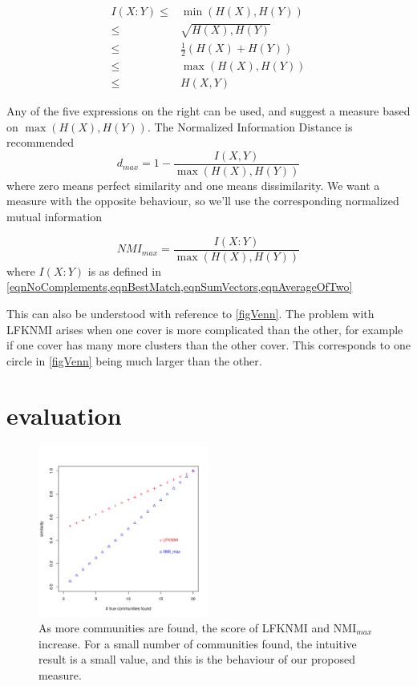 \documentclass[9pt,technote]{IEEEtran}
\begin{document}
\begin{equation}
	\begin{split}
	I(X:Y) \leq & \min(H(X),H(Y)) \\
	       \leq & \sqrt{H(X),H(Y)} \\
	       \leq & \frac12 \left(H(X)+H(Y)\right) \\
	       \leq & \max(H(X),H(Y)) \\
	       \leq & H(X,Y)
	\end{split}
\end{equation}

Any of the five expressions on the right can be used, and \cite{VinhEppsBailey} suggest
a measure based on $\max(H(X),H(Y))$. The Normalized Information Distance is recommended
\begin{equation*}
	d_{max} = 1 - \frac{ I(X,Y) }{ \max(H(X),H(Y)) }
\end{equation*}
where zero means perfect similarity and one means dissimilarity. We want a measure with
the opposite behaviour, so we'll use the corresponding normalized mutual information

\begin{equation}
	NMI_{max} = \frac{ I(X:Y) }{ \max(H(X),H(Y)) }
\end{equation}
where $I(X:Y)$ is as defined in \cref{eqnNoComplements,eqnBestMatch,eqnSumVectors,eqnAverageOfTwo}


This can also be understood with reference to \cref{figVenn}. The problem with LFKNMI arises
when one cover is more complicated than the other, for example if one cover has many
more clusters than the other cover.
This corresponds to one circle in \cref{figVenn} being much larger than the other.


\section{evaluation}
\label{secEval}

\begin{figure}
\includegraphics[width=0.5\textwidth]{plot}
\caption{As more communities are found, the score of LFKNMI and $\text{NMI}_{max}$ increase. For a small number of communities found, the intuitive result is a small value, and this is the behaviour of our proposed measure.}
\label{fig1to20}
\end{figure}
\end{document}
